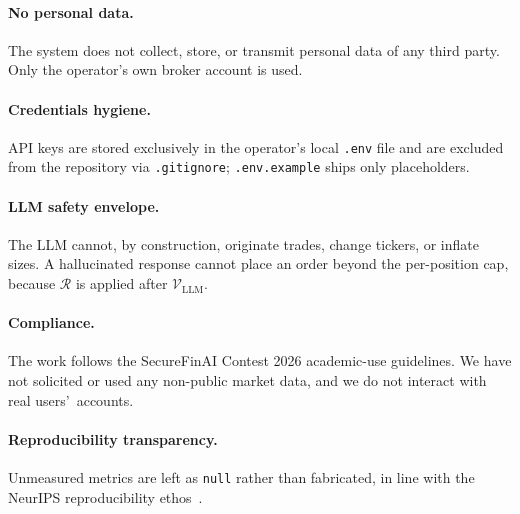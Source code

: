 \documentclass{article}
\begin{document}
\paragraph{No personal data.} The system does not collect, store, or transmit personal data of any third party. Only the operator\textquoteright s own broker account is used.
\paragraph{Credentials hygiene.} API keys are stored exclusively in the operator\textquoteright s local \texttt{.env} file and are excluded from the repository via \texttt{.gitignore}; \texttt{.env.example} ships only placeholders.
\paragraph{LLM safety envelope.} The LLM cannot, by construction, originate trades, change tickers, or inflate sizes. A hallucinated response cannot place an order beyond the per-position cap, because $\mathcal{R}$ is applied after $\mathcal{V}_{\text{LLM}}$.
\paragraph{Compliance.} The work follows the SecureFinAI Contest 2026 academic-use guidelines. We have not solicited or used any non-public market data, and we do not interact with real users\textquoteright\ accounts.
\paragraph{Reproducibility transparency.} Unmeasured metrics are left as \texttt{null} rather than fabricated, in line with the NeurIPS reproducibility ethos~\cite{pineau_reproducibility2020}.
\end{document}
